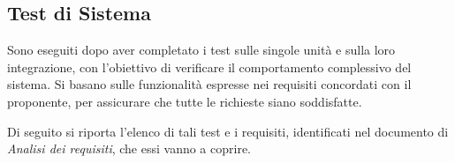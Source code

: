 \begin{xltabular}{0.9\textwidth}{X | p{0.6\textwidth}  | p{0.1\textwidth}}
    
\end{xltabular}

\subsection{Test di Sistema}
\par Sono eseguiti dopo aver completato i test sulle singole unità e sulla loro integrazione, con l'obiettivo di verificare il comportamento complessivo del sistema. Si basano sulle funzionalità espresse nei requisiti concordati con il proponente, per assicurare che tutte le richieste siano soddisfatte.

Di seguito si riporta l'elenco di tali test e i requisiti, identificati nel documento di \textit{Analisi dei requisiti}, che essi vanno a coprire.
\renewcommand{\arraystretch}{1.5}
